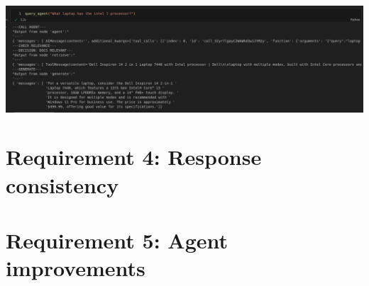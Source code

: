 \documentclass[11pt,letterpaper]{article}
\begin{document}
\begin{center}
    \includegraphics{q5.png}
\end{center}


\section*{Requirement 4: Response consistency}
\tab 

\section*{Requirement 5: Agent improvements}
\tab 
\end{document}
